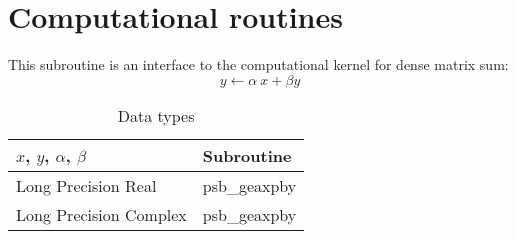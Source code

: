 \section{Computational routines}

%
%

This subroutine is an interface to the computational kernel for
dense matrix sum:
\[ y \leftarrow  \alpha\> x+ \beta y \] 


\begin{table}[h]
\begin{center}
\begin{tabular}{ll}
\hline
$x$, $y$, $\alpha$, $\beta$ & {\bf Subroutine}\\
\hline
Long Precision Real & psb\_geaxpby \\
Long Precision Complex & psb\_geaxpby \\
\hline
\end{tabular}
\end{center}
\caption{Data types\label{tab:f90axpby}}
\end{table}

